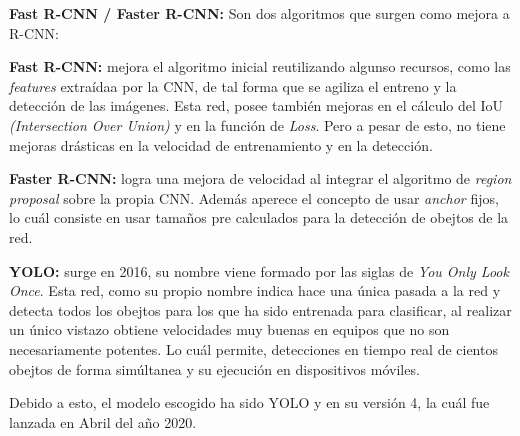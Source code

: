\begin{list}{\textbullet}{ %
    \addtolength{\itemsep}{-2mm} %
    \setlength{\itemindent}{2mm}}

    \item \textbf{Fast R-CNN / Faster R-CNN:} Son dos algoritmos que surgen como mejora a R-CNN: \cite{faster_rcnn}
    \begin{list}{\textbullet}{ %
        \addtolength{\itemsep}{-2mm} %
        \setlength{\itemindent}{2mm}}
        \item \textbf{Fast R-CNN:} mejora el algoritmo inicial reutilizando algunso recursos, como las \textit{features} extraídaa por la CNN, de tal forma que se agiliza el entreno y la detección de las imágenes.
        Esta red, posee también mejoras en el cálculo del IoU \textit{(Intersection Over Union)} y en la función de \textit{Loss}. Pero a pesar de esto, no tiene mejoras drásticas en la velocidad de entrenamiento y en la detección.
       \item \textbf{Faster R-CNN:} logra una mejora de velocidad al integrar el algoritmo de \textit{region proposal} \cite{region_proposal} sobre la propia CNN.
       Además aperece el concepto de usar \textit{anchor} fijos, lo cuál consiste en usar tamaños pre calculados para la detección de obejtos de la red. 
    \end{list}
    
    \item \textbf{YOLO:} surge en 2016, su nombre viene formado por las siglas de \textit{You Only Look Once}.\cite{yolov4}
    Esta red, como su propio nombre indica hace una única pasada a la red y detecta todos los obejtos para los que ha sido entrenada para clasificar, al realizar un único vistazo obtiene velocidades muy buenas en equipos que no son necesariamente potentes. Lo cuál permite, detecciones en tiempo real de cientos obejtos de forma simúltanea y su ejecución en dispositivos móviles.  
\end{list}
Debido a esto, el modelo escogido ha sido YOLO y en su versión 4, la cuál fue lanzada en Abril del año 2020.

